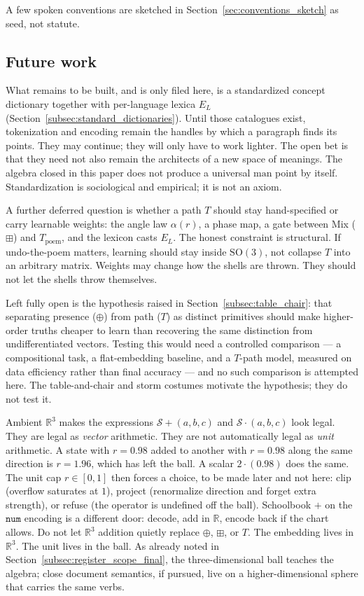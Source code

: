 \documentclass[12pt, a4paper]{article}
\begin{document}
A few spoken conventions are sketched in
Section~\ref{sec:conventions_sketch} as seed, not statute.

\subsection{Future work}
\label{subsec:future_work}
What remains to be built, and is only filed here, is a standardized
concept dictionary together with per-language lexica $E_L$
(Section~\ref{subsec:standard_dictionaries}). Until those catalogues
exist, tokenization and encoding remain the handles by which a
paragraph finds its points. They may continue; they will only have to
work lighter. The open bet is that they need not also
remain the architects of a new space of meanings.
The algebra closed in this paper does not produce a universal
$\mathrm{man}$ point by itself. Standardization is sociological and
empirical; it is not an axiom.

A further deferred question is whether a path $T$ should stay
hand-specified or carry learnable weights: the angle law
$\alpha(r)$, a phase map, a gate between Mix ($\boxplus$) and
$T_{\mathrm{poem}}$, and the lexicon casts $E_L$. The honest
constraint is structural. If undo-the-poem matters, learning should
stay inside $\mathrm{SO}(3)$, not collapse $T$ into an arbitrary
matrix. Weights may change how the shells are thrown. They should
not let the shells throw themselves.

Left fully open is the hypothesis raised in
Section~\ref{subsec:table_chair}: that separating presence
($\oplus$) from path ($T$) as distinct primitives should make
higher-order truths cheaper to learn than recovering the same
distinction from undifferentiated vectors. Testing this would need a
controlled comparison --- a compositional task, a flat-embedding
baseline, and a $T$-path model, measured on data efficiency rather
than final accuracy --- and no such comparison is attempted here.
The table-and-chair and storm costumes motivate the hypothesis; they
do not test it.

Ambient $\mathbb{R}^3$ makes the expressions
$\mathcal{S}+(a,b,c)$ and $\mathcal{S}\cdot(a,b,c)$ look legal.
They are legal as \emph{vector} arithmetic. They are not automatically
legal as \emph{unit} arithmetic. A state with $r=0.98$ added to
another with $r=0.98$ along the same direction is $r=1.96$, which
has left the ball. A scalar $2\cdot(0.98)$ does the same. The unit
cap $r\in[0,1]$ then forces a choice, to be made later and not
here: clip (overflow saturates at $1$), project (renormalize
direction and forget extra strength), or refuse (the operator is
undefined off the ball). Schoolbook $+$ on the $\mathtt{num}$
encoding is a different door: decode, add in $\mathbb{R}$, encode
back if the chart allows. Do not let $\mathbb{R}^3$ addition
quietly replace $\oplus$, $\boxplus$, or $T$. The embedding
lives in $\mathbb{R}^3$. The unit lives in the ball.
As already noted in Section~\ref{subsec:register_scope_final},
the three-dimensional ball teaches the algebra; close document
semantics, if pursued, live on a higher-dimensional sphere that
carries the same verbs.
\end{document}
